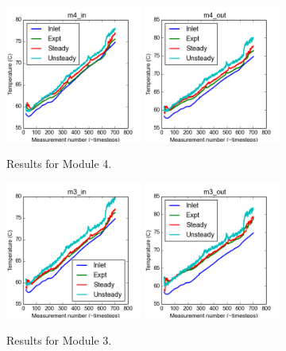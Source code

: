 \documentclass{article}
\begin{document}
\clearpage
\begin{figure}[!ht]
\centering
\includegraphics[width=0.4\textwidth]{../../data/ICSolar/images/Feb11_m4_in_compare.png}\hspace{0.05\textwidth}
\includegraphics[width=0.4\textwidth]{../../data/ICSolar/images/Feb11_m4_out_compare.png}\hspace{0.05\textwidth}\\
\caption{Results for Module 4.}\end{figure}
\begin{figure}[!ht]
\centering
\includegraphics[width=0.4\textwidth]{../../data/ICSolar/images/Feb11_m3_in_compare.png}\hspace{0.05\textwidth}
\includegraphics[width=0.4\textwidth]{../../data/ICSolar/images/Feb11_m3_out_compare.png}\hspace{0.05\textwidth}\\
\caption{Results for Module 3.}\end{figure}
\end{document}
